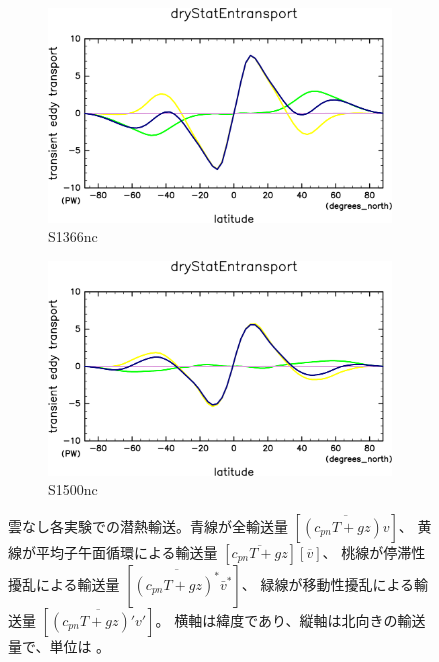 \documentclass[body]{subfiles}
\begin{document}
\begin{figure}[t]
	\centering
	\begin{subfigure}{.4\textwidth}
		\centering
		\includegraphics[width=\textwidth]{S1366-nc/MeriHeatTrans@dryStatEn,time=3650:4015-crop-rotate.pdf}
		\caption{S1366nc}\label{乾燥静的エネルギーS1366nc}
	\end{subfigure}
	\begin{subfigure}{.4\textwidth}
		\centering
		\includegraphics[width=\textwidth]{S1500-nc/MeriHeatTrans@dryStatEn,time=3650:4015-crop-rotate.pdf}
		\caption{S1500nc}\label{乾燥静的エネルギーS1500nc}
	\end{subfigure}
	\caption[雲なし各実験での乾燥静的エネルギー輸送の内訳]{
		雲なし各実験での潜熱輸送。青線が全輸送量 \([\overline{(c_{pn}T+gz)v}]\)、
		黄線が平均子午面循環による輸送量 \([\overline{c_{pn}T+gz}][\overline{v}]\)、
		桃線が停滞性擾乱による輸送量 \([\overline{(c_{pn}T+gz)^*}\bar v^*]\)、
		緑線が移動性擾乱による輸送量 \([\overline{(c_{pn}T+gz)'v'}]\)。
		横軸は緯度であり、縦軸は北向きの輸送量で、単位は 。
	}\label{乾燥静的エネルギーnc}
\end{figure}
\end{document}
